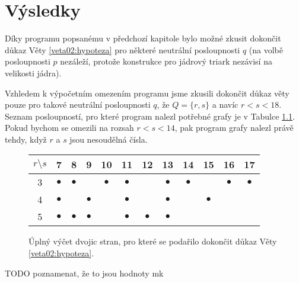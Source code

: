 \chapter{Výsledky} \label{vysledky}

Díky programu popsanému v předchozí kapitole bylo možné zkusit dokončit důkaz Věty \ref{veta02:hypoteza} pro některé neutrální posloupnosti $q$ (na volbě posloupnosti $p$ nezáleží, protože konstrukce pro jádrový triark nezávisí na velikosti jádra). 

Vzhledem k výpočetním omezením programu jsme zkusili dokončit důkaz věty pouze pro takové neutrální posloupnosti $q$, že $Q = \lbrace r, s\rbrace$ a navíc $r<s<18$. Seznam posloupností, pro které program nalezl potřebné grafy je v Tabulce \ref{obr03:tabvysledky}. Pokud bychom se omezili na rozsah $r<s<14$, pak program grafy nalezl právě tehdy, když $r$ a $s$ jsou nesoudělná čísla.

\begin{figure}[h]\centering
\begin{tabular}{ c | c c c c c c c c c c c }
  {$r\setminus s$} & 7 & 8 & 9 & 10 & 11 & 12 & 13 & 14 & 15 & 16 & 17 \\ \hline
  3 & $\bullet$ & $\bullet$ &  & $\bullet$ & $\bullet$ &  & $\bullet$ & $\bullet$ &  & $\bullet$ & $\bullet$ \\
  4 & $\bullet$ &  & $\bullet$ &  & $\bullet$ &  & $\bullet$ &  & $\bullet$ \\
  5 & $\bullet$ & $\bullet$ & $\bullet$ &  & $\bullet$ & $\bullet$ & $\bullet$  
\end{tabular}
\caption{Úplný výčet dvojic stran, pro které se podařilo dokončit důkaz Věty \ref{veta02:hypoteza}.}
\label{obr03:tabvysledky}
\end{figure}


TODO poznamenat, že to jsou hodnoty mk

